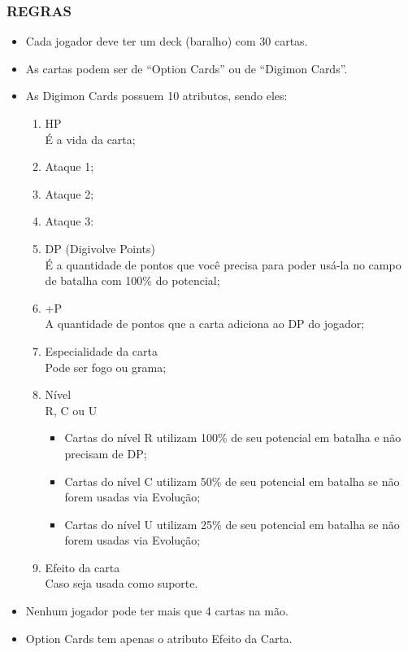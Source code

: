 \documentclass[12pt,a4paper,brazil,abntex2]{article}
\begin{document}
		\subsubsection{\normalsize REGRAS}
			\begin{itemize}
				\item Cada jogador deve ter um deck (baralho) com 30 cartas.
				\item As cartas podem ser de ``Option Cards''  ou de ``Digimon Cards''.
				\item As Digimon Cards possuem 10 atributos, sendo eles:
					\begin{enumerate}

						\item HP\\É a vida da carta;
     					\item Ataque 1;
     					\item Ataque 2;
						\item Ataque 3:
						\item DP (Digivolve Points)\\É a quantidade de pontos que você precisa para poder usá-la no campo de batalha com 100\% do potencial;
     					\item +P\\A quantidade de pontos que a carta adiciona ao DP do jogador;
     					\item Especialidade da carta\\Pode ser fogo ou grama;
     					\item Nível\\R, C ou U\\
							\begin{itemize}
								\item Cartas do nível R utilizam 100\% de seu potencial em batalha e não precisam de DP; 
								\item Cartas do nível C utilizam 50\% de seu potencial em batalha se não forem usadas via Evolução; 
								\item Cartas do nível U utilizam 25\% de seu potencial em batalha se não forem usadas via Evolução; 
								\end{itemize}
						\item Efeito da carta\\Caso seja usada como suporte.
					\end{enumerate}
				\item Nenhum jogador pode ter mais que 4 cartas na mão.
				\item Option Cards tem apenas o atributo Efeito da Carta.
			\end{itemize}				
\end{document}
